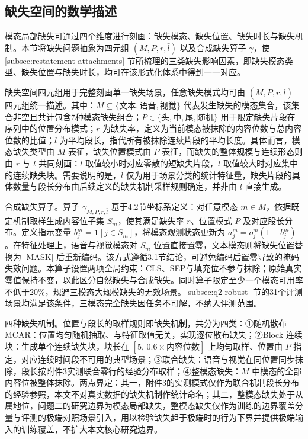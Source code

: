 \documentclass[colorprint,nocoverzero]{gmcmthesis}
\begin{document}
\subsection{缺失空间的数学描述}\label{subsec:q2-missing}
模态局部缺失可通过四个维度进行刻画：缺失模态、缺失位置、缺失时长与缺失机制。本节将缺失问题抽象为四元组 $(M, P, r, \bar l)$ 以及合成缺失算子 $\gamma$，使 \ref{subsec:restatement-attachments} 节所梳理的三类缺失影响因素，即缺失模态类型、缺失位置与缺失时长，均可在该形式化体系中得到一一对应。

缺失空间四元组用于完整刻画单一缺失场景，任意缺失模式均可由 $(M, P, r, \bar l)$ 四元组统一描述。其中：$M\subseteq\{\text{文本},\text{语音},\text{视觉}\}$ 代表发生缺失的模态集合，该集合非空且共计包含7种模态缺失组合；$P\in\{\text{头},\text{中},\text{尾},\text{随机}\}$ 用于限定缺失片段在序列中的位置分布模式；$r$ 为缺失率，定义为当前模态被抹除的内容位数与总内容位数的比值；$\bar l$ 为平均段长，指代所有被抹除连续片段的平均长度。具体而言，模态缺失类型由 $M$ 表征，缺失位置模式由 $P$ 表征，而缺失的整体规模与连续形态则由 $r$ 与 $\bar l$ 共同刻画：$\bar l$ 取值较小时对应零散的短缺失片段，$\bar l$ 取值较大时对应集中的连续缺失块。需要说明的是，$\bar l$ 仅为用于场景分类的统计特征量，缺失片段的具体数量与段长分布由后续定义的缺失机制采样规则确定，并非由 $\bar l$ 直接生成。

合成缺失算子。算子 $\gamma_{M,P,r,\bar l}$ 基于4.2节坐标系定义：对任意模态 $m\in M$，依据既定机制取样生成内容位子集 $S_m$，使其满足缺失率 $r$、位置模式 $P$ 及对应段长分布。定义指示变量 $b_j^m=\mathbf{1}[j\in S_m]$，将模态观测状态更新为 $a_j^m=o_j^m(1-b_j^m)$。在特征处理上，语音与视觉模态对 $S_m$ 位置直接置零，文本模态则将缺失位置替换为 [MASK] 后重新编码。该方式遵循3.1节结论，可避免编码后置零导致的掩码失效问题。本算子设置两项全局约束：CLS、SEP与填充位不参与抹除；原始真实零值保持不变，以此区分自然缺失与合成缺失。同时算子限定至少一个模态可用率不低于20\%，规避三模态大规模缺失的无效场景。\ref{subsec:q2-robust} 节的31个评测场景均满足该条件，三模态完全缺失因任务不可解，不纳入评测范围。

四种缺失机制。位置与段长的取样规则即缺失机制，共分为四类：①随机散布 MCAR：位置均匀随机抽取、与特征取值无关，实现逐位散布缺失；②Block 连续块：生成单个连续缺失块，块长在 $[5,\,0.6\times\text{内容位数}]$ 上均匀取样、位置由 $P$ 指定，对应连续时间段不可用的典型场景；③联合缺失：语音与视觉在同位置同步抹除，段长按附件3实测联合零行的经验分布取样；④整模态缺失：$M$ 中模态的全部内容位被整体抹除。两点界定：其一，附件3的实测模式仅作为联合机制段长分布的经验参照，本文不对真实数据的缺失机制作统计命名；其二，整模态缺失处于从属地位，问题二的研究边界为模态局部缺失，整模态缺失仅作为训练的边界覆盖分量与评测的极端对照场景引入，用以检验缺失趋于极端时的行为下界并提供极端输入的训练覆盖，不扩大本文核心研究边界。
\end{document}
